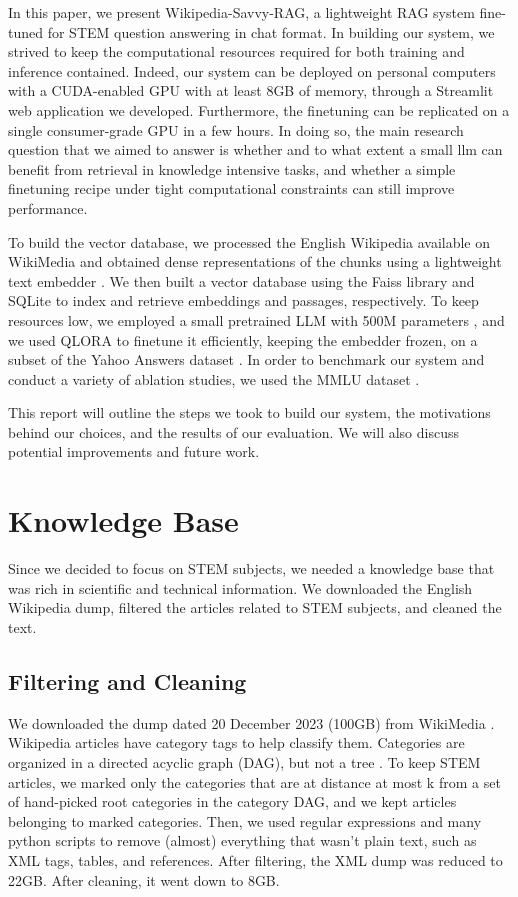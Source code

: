 \documentclass[11pt]{article}
\begin{document}
In this paper, we present Wikipedia-Savvy-RAG, a lightweight RAG system fine-tuned for STEM question answering
in chat format. In building our system, we strived to keep the computational resources required for both
training and inference contained. Indeed, our system can be deployed on personal computers with a CUDA-enabled GPU
with at least 8GB of memory, through a Streamlit web application we developed. Furthermore, the finetuning can 
be replicated on a single consumer-grade GPU in a few hours. In doing so, the main research question that we aimed to
answer is whether and to what extent a small llm can benefit from retrieval in knowledge intensive tasks, and whether a
simple finetuning recipe under tight computational constraints can still improve performance. 

To build the vector database, we processed the English Wikipedia available on WikiMedia \cite{wikimedia} and obtained 
dense representations of the chunks using a lightweight text embedder \cite{baai}. We then built a vector database using
the Faiss library \cite{faiss} and SQLite \cite{sqlite} to index and retrieve embeddings and passages, respectively. To keep resources low,
we employed a small pretrained LLM with 500M parameters \cite{qwen}, and we used QLORA \cite{qlora} to finetune it efficiently, 
keeping the embedder frozen, on a subset of the Yahoo Answers dataset \cite{yahoo_answers}.
In order to benchmark our system and conduct a variety of ablation studies, we used the MMLU dataset \cite{mmlu}.

This report will outline the steps we took to build our system, the motivations behind our choices, and the results of our evaluation.
We will also discuss potential improvements and future work.

\section{Knowledge Base}

Since we decided to focus on STEM subjects, we needed a knowledge base that was rich in scientific and technical information.
We downloaded the English Wikipedia dump, filtered the articles related to STEM subjects, and cleaned the text.

\subsection{Filtering and Cleaning}

We downloaded the dump dated 20 December 2023 (100GB) from WikiMedia \cite{wikimedia}. Wikipedia articles have category tags to help classify them.
Categories are organized in a directed acyclic graph (DAG), but not a tree \cite{wikipedia_category_tree}. To keep STEM articles, we marked only the categories that are at
distance at most k from a set of hand-picked root categories in the category DAG, and we kept articles belonging to marked categories.
Then, we used regular expressions and many python scripts to remove (almost) everything that wasn't plain text, such as XML tags, tables, and references. After filtering, the XML
dump was reduced to 22GB. After cleaning, it went down to 8GB.
\end{document}
